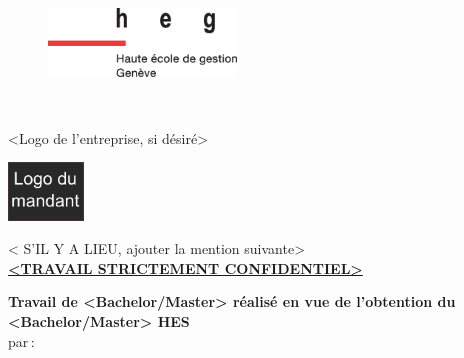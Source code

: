 
\makeatletter	%
	\begin{titlepage}

		\begin{figure}[H]
			\includegraphics[width=5cm]{images/heg-logo.eps}
		\end{figure}
	
		\begin{center}
			
			{\large \textbf{\Huge \@title}} \\

			\vspace{2cm}
			
			<Logo de l'entreprise, si désiré>\\	%
			
			\vspace{.2cm}
			
			\includegraphics[width=2cm]{images/logo-mandant.png}
			
			\vspace{1cm}
			\vfill
		
			{\large < S'IL Y A LIEU, ajouter la mention suivante>}\\
				\textbf{\Large \underline{<TRAVAIL STRICTEMENT CONFIDENTIEL>}}

			\vspace{2cm}

			\textbf{\large Travail de <Bachelor/Master> réalisé en vue de l’obtention du <Bachelor/Master> HES}\\
				par\textbf{\,}:\\
				\textbf{\large <Prénom NOM>}\\


\end{center}
\end{titlepage}
